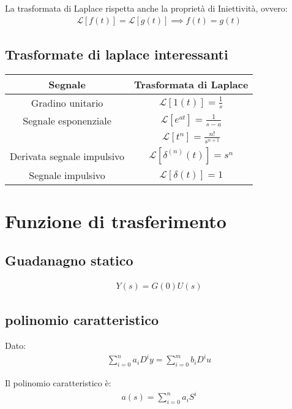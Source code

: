 \documentclass{article}
\begin{document}
La trasformata di Laplace rispetta anche la proprietà di Iniettività, ovvero:
\begin{align}
  \mathcal{L}[f(t)] = \mathcal{L}[g(t)] \implies f(t) = g(t)
\end{align}

\renewcommand{\arraystretch}{1.5} %
\subsection{Trasformate di laplace interessanti}
\begin{center}
  
\begin{tabular}{| c | c |}
  \hline
  Segnale & Trasformata di Laplace \\
  \hline
  Gradino unitario & $\mathcal{L}[1(t)] = \frac{1}{s}$ \\
  \hline
  Segnale esponenziale & $\mathcal{L}[e^{at}] = \frac{1}{s-a}$ \\
  \hline
  & $\mathcal{L}[t^n] = \frac{n!}{s^{n+1}}$ \\
  \hline
  Derivata segnale impulsivo & $\mathcal{L}[\delta^{(n)}(t)] = s^n$ \\
  \hline
  Segnale impulsivo & $\mathcal{L}[\delta(t)] = 1$ \\
  \hline
\end{tabular}
\end{center}

\section{Funzione di trasferimento}
\subsection{Guadanagno statico}
\begin{align}
  Y(s) = G(0) U(s)
\end{align}

\subsection{polinomio caratteristico}
Dato:
\begin{align}
  \sum_{i=0}^n a_i D^i y = \sum_{i=0}^m b_i D^i u
\end{align}

Il polinomio caratteristico è:
\begin{align}
  a(s) = \sum_{i=0}^n a_i S^i
\end{align}
\end{document}
